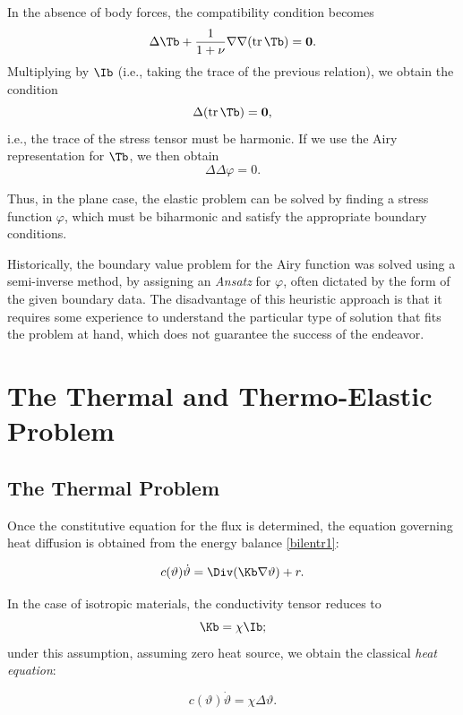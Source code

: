 	In the absence of body forces, the compatibility condition becomes
	\begin{equation}
		\Delta \Tb + \frac{1}{1+\nu} \nabla \nabla (\operatorname{tr}\Tb) = \mathbf{0}.
	\end{equation}
	Multiplying by $\Ib$ (i.e., taking the trace of the previous relation), we obtain the condition
	\begin{equation}\label{trharm}
		\Delta (\operatorname{tr}\Tb) = \mathbf{0},
	\end{equation}
	i.e., the trace of the stress tensor must be harmonic. If we use the Airy representation for $\Tb$, we then obtain
	\begin{equation}\label{biharmonic} 
		\Delta \Delta \varphi = 0.
	\end{equation}
	
	Thus, in the plane case, the elastic problem can be solved by finding a stress function $\varphi$, which must be biharmonic and satisfy the appropriate boundary conditions.
	
	Historically, the boundary value problem for the Airy function was solved using a semi-inverse method, by assigning an \textit{Ansatz} for $\varphi$, often dictated by the form of the given boundary data. The disadvantage of this heuristic approach is that it requires some experience to understand the particular type of solution that fits the problem at hand, which does not guarantee the success of the endeavor.
	
	
\chapter{The Thermal and Thermo-Elastic Problem}
\section{The Thermal Problem}
Once the constitutive equation for the flux is determined, the equation governing heat diffusion is obtained from the energy balance \eqref{bilentr1}:
\begin{definition}
	\begin{equation}
		c(\vartheta)\dot{\vartheta} = \Div (\Kb \nabla \vartheta) + r.
	\end{equation}
\end{definition}

In the case of isotropic materials, the conductivity tensor reduces to
\begin{equation}
	\Kb = \chi \Ib;
\end{equation}
under this assumption, assuming zero heat source, we obtain the classical \textit{heat equation}:
\begin{definition}
	\begin{equation}
		c(\vartheta)\dot{\vartheta} = \chi \Delta \vartheta.
	\end{equation}
\end{definition}

